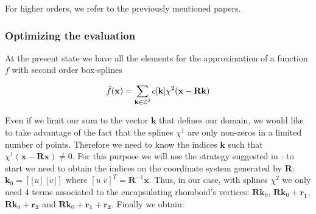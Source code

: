 \documentclass[proc]{edpsmath}
\begin{document}
%

For higher orders, we refer to the previously mentioned papers.

\subsubsection{Optimizing the evaluation}

At the present state we have all the elements for the approximation of a function $f$ with second order box-splines

\begin{equation}
\tilde{f}(\mathbf{x}) = \sum_{\mathbf{k} \in \mathbb{Z}^2} c[\mathbf{k}] \chi^2(\mathbf{x} - \mathbf{R}\mathbf{k})
\end{equation}

Even if we limit our sum to the vector $\mathbf{k}$ that defines our domain, we would like to take advantage of the fact that the splines $\chi^1$ are only non-zeros in a limited number of points. Therefore we need to know the indices $\mathbf{k}$ such that $\chi^1(\mathbf{x} - \mathbf{R} \mathbf{x}) \neq 0$. For this purpose we will use the strategy suggested in \cite{Condat2007}: to start we need to obtain the indices on the coordinate system generated by $\mathbf{R}$: $\mathbf{k}_0 = \left[ \lfloor u \rfloor \; \lfloor v \rfloor \right]$ where $\left[ u \; v \right]^T = \mathbf{R}^ {-1} \mathbf{x} $. Thus, in our case, with splines $\chi^2$ we only need 4 terms associated to the encapsulating rhomboid's vertices: $\mathbf{R}\mathbf{k}_0$, $\mathbf{R}\mathbf{k}_0 + \mathbf{r_1}$, $\mathbf{R}\mathbf{k}_0 + \mathbf{r_2}$ and $\mathbf{R}\mathbf{k}_0 + \mathbf{r_1} + \mathbf{r_2}$. Finally we obtain:
\end{document}
